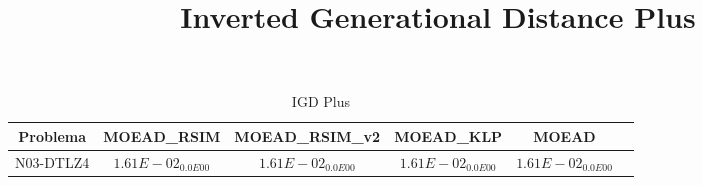 \documentclass{article}
\title{Inverted Generational Distance Plus}
\author{}
\begin{document}
\maketitle
\begin{table*}[ht!]
\scriptsize
\caption{IGD Plus}
\centering\begin{tabular}{|c||c||c||c||c||c|} \hline
Problema &MOEAD_RSIM &MOEAD_RSIM_v2 &MOEAD_KLP &MOEAD\\\hline
N03-DTLZ4 &\cellcolor{gray95}$1.61E-02_{0.0E00}$ &\cellcolor{gray25}$1.61E-02_{0.0E00}$ &$1.61E-02_{0.0E00}$ &$1.61E-02_{0.0E00}$\\ 
\hline
\end{tabular}
\end{table*}
\end{document}
